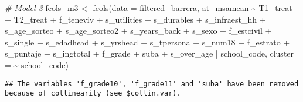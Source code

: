 \documentclass[
]{article}
\newenvironment{Shaded}{\begin{snugshade}}{\end{snugshade}}
\newcommand{\AttributeTok}[1]{\textcolor[rgb]{0.77,0.63,0.00}{#1}}
\newcommand{\CommentTok}[1]{\textcolor[rgb]{0.56,0.35,0.01}{\textit{#1}}}
\newcommand{\FunctionTok}[1]{\textcolor[rgb]{0.00,0.00,0.00}{#1}}
\newcommand{\NormalTok}[1]{#1}
\newcommand{\OtherTok}[1]{\textcolor[rgb]{0.56,0.35,0.01}{#1}}
\newcommand{\SpecialCharTok}[1]{\textcolor[rgb]{0.00,0.00,0.00}{#1}}
\begin{document}
\begin{Shaded}
\begin{Highlighting}[]
\CommentTok{\# Model 3}
\NormalTok{feols\_m3 }\OtherTok{\textless{}{-}} \FunctionTok{feols}\NormalTok{(}\AttributeTok{data =}\NormalTok{ filtered\_barrera, }
\NormalTok{                  at\_msamean }\SpecialCharTok{\textasciitilde{}}\NormalTok{ T1\_treat }\SpecialCharTok{+}\NormalTok{ T2\_treat }\SpecialCharTok{+}\NormalTok{ f\_teneviv }\SpecialCharTok{+}\NormalTok{ s\_utilities }\SpecialCharTok{+}\NormalTok{ s\_durables }\SpecialCharTok{+}\NormalTok{ s\_infraest\_hh }\SpecialCharTok{+}\NormalTok{ s\_age\_sorteo }\SpecialCharTok{+}\NormalTok{ s\_age\_sorteo2 }\SpecialCharTok{+}\NormalTok{ s\_years\_back }\SpecialCharTok{+}\NormalTok{ s\_sexo }\SpecialCharTok{+}\NormalTok{ f\_estcivil }\SpecialCharTok{+}\NormalTok{ s\_single }\SpecialCharTok{+}\NormalTok{ s\_edadhead }\SpecialCharTok{+}\NormalTok{ s\_yrshead }\SpecialCharTok{+}\NormalTok{ s\_tpersona }\SpecialCharTok{+}\NormalTok{ s\_num18 }\SpecialCharTok{+}\NormalTok{ f\_estrato }\SpecialCharTok{+}\NormalTok{ s\_puntaje }\SpecialCharTok{+}\NormalTok{ s\_ingtotal }\SpecialCharTok{+}\NormalTok{ f\_grade }\SpecialCharTok{+}\NormalTok{ suba }\SpecialCharTok{+}\NormalTok{ s\_over\_age }\SpecialCharTok{|}\NormalTok{ school\_code,}
                  \AttributeTok{cluster =} \SpecialCharTok{\textasciitilde{}}\NormalTok{ school\_code)}
\end{Highlighting}
\end{Shaded}

\begin{verbatim}
## The variables 'f_grade10', 'f_grade11' and 'suba' have been removed because of collinearity (see $collin.var).
\end{verbatim}
\end{document}
